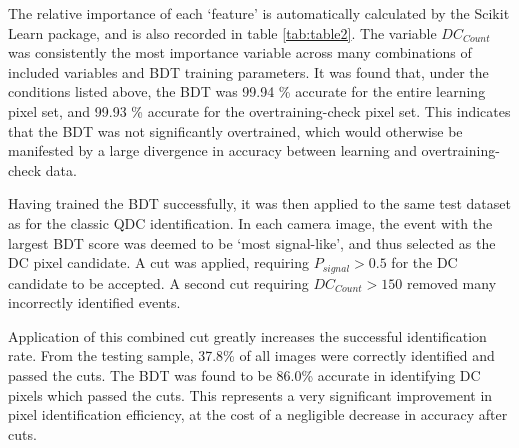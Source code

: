 \documentclass[]{article}
\begin{document}
The relative importance of each \textquoteleft feature' is automatically calculated by the Scikit Learn package, and is also recorded in table \ref{tab:table2}. The variable $DC_{Count}$ was consistently the most importance variable across many combinations of included variables and BDT training parameters. It was found that, under the conditions listed above, the BDT was 99.94 \% accurate for the entire learning pixel set, and 99.93 \%  accurate for the overtraining-check pixel set. This indicates that the BDT was not significantly overtrained, which would otherwise be manifested by a large divergence in accuracy between learning and overtraining-check data.

Having trained the BDT successfully, it was then applied to the same test dataset as for the classic QDC identification. In each camera image, the event with the largest BDT score was deemed to be \textquoteleft most signal-like', and thus selected as the DC pixel candidate. A cut was applied, requiring $P_{signal} > 0.5$ for the DC candidate to be accepted. A second cut requiring $DC_{Count} > 150$ removed many incorrectly identified events. 

Application of this combined cut greatly increases the successful identification rate. From the testing sample, 37.8\% of all images were correctly identified and passed the cuts. The BDT was found to be 86.0\% accurate in identifying DC pixels which passed the cuts. This represents a very significant improvement in pixel identification efficiency, at the cost of a negligible decrease in accuracy after cuts.
\end{document}
